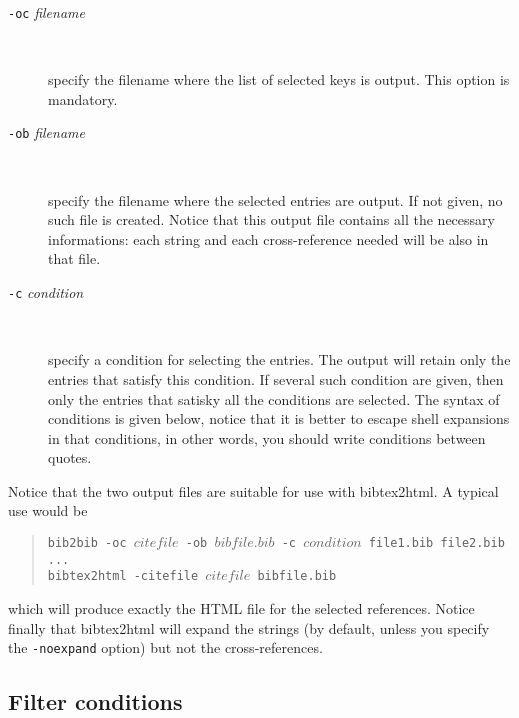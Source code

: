 \documentclass[11pt,a4paper]{article}
\begin{document}
\begin{description}
  
\item[\texttt{-oc} \textit{filename}] ~

  specify the filename where the list of selected keys is output. This
  option is mandatory.

\item[\texttt{-ob} \textit{filename}] ~

  specify the filename where the selected entries are output. If not
  given, no such file is created. Notice that this output file
  contains all the necessary informations: each string and each
  cross-reference needed will be also in that file.

\item[\texttt{-c} \textit{condition}] ~

  specify a condition for selecting the entries. The output will
  retain only the entries that satisfy this condition. If several such
  condition are given, then only the entries that satisky all the
  conditions are selected. The syntax of conditions is given below,
  notice that it is better to escape shell expansions in that
  conditions, in other words, you should write conditions between
  quotes. 

\end{description}

Notice that the two output files are suitable for use with
bibtex2html.  A typical use would be
\begin{quote}
\texttt{bib2bib -oc $citefile$ -ob $bibfile.bib$ -c $condition$
  file1.bib file2.bib ... } \\
\texttt{bibtex2html -citefile $citefile$ bibfile.bib}
\end{quote}
which will produce exactly the HTML file for the selected
references. Notice finally that bibtex2html will expand the strings
(by default, unless you specify the \verb|-noexpand| option) but not
the cross-references.

\subsection{Filter conditions}
\end{document}
